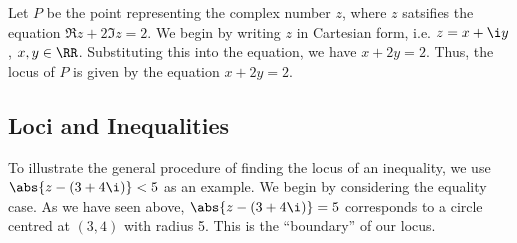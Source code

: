 \begin{example}
    Let $P$ be the point representing the complex number $z$, where $z$ satsifies the equation $\Re z + 2 \Im z = 2$. We begin by writing $z$ in Cartesian form, i.e. $z = x + \i y$, $x, y \in \RR$. Substituting this into the equation, we have $x + 2y = 2$. Thus, the locus of $P$ is given by the equation $x + 2y = 2$.
\end{example}

\subsection{Loci and Inequalities}

To illustrate the general procedure of finding the locus of an inequality, we use $\abs{z - (3 + 4\i)} < 5$ as an example. We begin by considering the equality case. As we have seen above, $\abs{z - (3 + 4\i)} = 5$ corresponds to a circle centred at $(3, 4)$ with radius 5. This is the ``boundary'' of our locus.

\begin{center}
\end{center}

